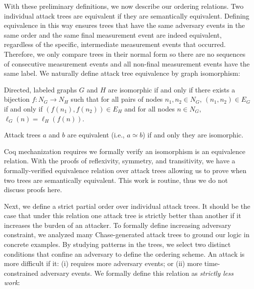 \documentclass[runningheads]{llncs}
\theoremstyle{definition}
\begin{document}
With these preliminary definitions, we now describe our ordering
relations. Two individual attack trees are equivalent if they are
semantically equivalent. Defining equivalence in this way ensures
trees that have the same adversary events in the same order and the
same final measurement event are indeed equivalent, regardless of the
specific, intermediate measurement events that occurred. Therefore, we
only compare trees in their normal form so there are no sequences of
consecutive measurement events and all non-final measurement events
have the same label.  We naturally define attack tree equivalence by
graph isomorphism:


\begin{definition}[Isomorphism]
  Directed, labeled graphs $G$ and $H$ are isomorphic if and only if
  there exists a bijection $f : N_G \to N_H$ such that for all pairs
  of nodes $n_1, n_2 \in N_G$, $(n_1,n_2) \in E_G$ if and only if
  $(f(n_1),f(n_2)) \in E_H$ and for all nodes $n \in N_G$,
  $\ell_G(n) = \ell_H(f(n))$. 
\end{definition}

\begin{definition}
  Attack trees $a$ and $b$ are equivalent (i.e., $a \simeq b$) if and
  only they are isomorphic. 
\end{definition}

\noindent Coq mechanization requires we formally verify an isomorphism
is an equivalence relation.  With the proofs of reflexivity, symmetry,
and transitivity, we have a formally-verified equivalence relation
over attack trees allowing us to prove when two trees are semantically
equivalent. This work is routine, thus we do not discuss proofs here.

Next, we define a strict partial order over individual attack
trees. It should be the case that under this relation one attack tree
is strictly better than another if it increases the burden of an
attacker. To formally define increasing adversary constraint, we
analyzed many Chase-generated attack trees to ground our logic in
concrete examples. By studying patterns in the trees, we select two
distinct conditions that confine an adversary to define the ordering
scheme.  An attack is more difficult if it: (i) requires more
adversary events; or (ii) more time-constrained adversary events. We
formally define this relation as \emph{strictly less work}:
\end{document}

